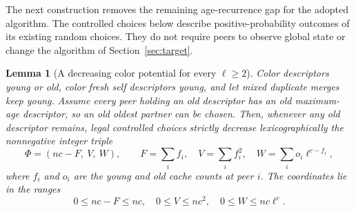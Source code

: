 \documentclass[11pt]{article}
\newtheorem{lemma}[theorem]{Lemma}
\begin{document}
The next construction removes the remaining age-recurrence gap
for the adopted algorithm. The controlled choices below describe
positive-probability outcomes of its existing random choices.
They do not require peers to observe global state or change the
algorithm of Section~\ref{sec:target}.

\begin{lemma}[A decreasing color potential for every $\ell\ge2$]
\label{lem:generalcolor}
Color descriptors young or old, color fresh self descriptors
young, and let mixed duplicate merges keep young. Assume every
peer holding an old descriptor has an old maximum-age descriptor,
so an old oldest partner can be chosen. Then, whenever any old
descriptor remains, legal controlled choices strictly decrease
lexicographically the nonnegative integer triple
\[
 \Phi=\left(nc-F,\ V,\ W\right),\qquad
 F=\sum_i f_i,\quad V=\sum_i f_i^2,\quad
 W=\sum_i o_i\ell^{c-f_i},
\]
where $f_i$ and $o_i$ are the young and old cache counts at
peer $i$. The coordinates lie in the ranges
\[
 0\le nc-F\le nc,\quad 0\le V\le nc^2,\quad
 0\le W\le nc\ell^c.
\]
\end{lemma}
\end{document}
